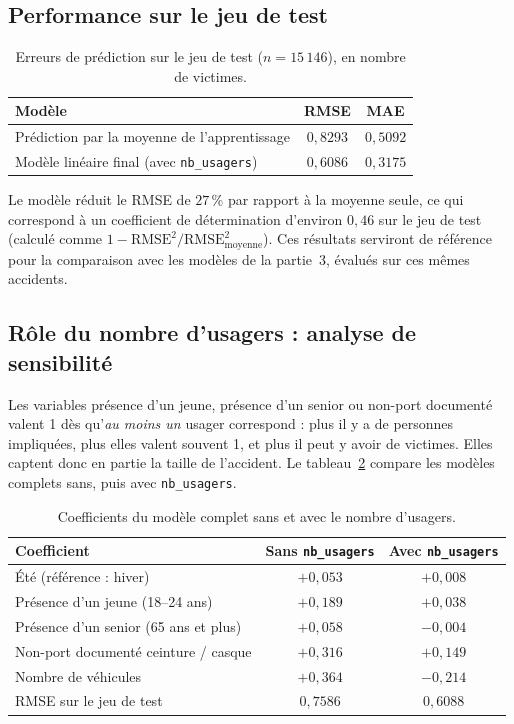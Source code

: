 \documentclass[11pt,a4paper]{article}
\begin{document}
\subsection{Performance sur le jeu de test}
\begin{table}[H]
\centering
\small
\begin{tabular}{lcc}
\toprule
\textbf{Modèle} & \textbf{RMSE} & \textbf{MAE} \\
\midrule
Prédiction par la moyenne de l'apprentissage & $0{,}8293$ & $0{,}5092$ \\
Modèle linéaire final (avec \texttt{nb\_usagers}) & $0{,}6086$ & $0{,}3175$ \\
\bottomrule
\end{tabular}
\caption{Erreurs de prédiction sur le jeu de test ($n = 15\,146$), en nombre de victimes.}
\label{tab:perf_test}
\end{table}
Le modèle réduit le RMSE de $27\,\%$ par rapport à la moyenne seule, ce qui correspond à un coefficient de détermination d'environ $0{,}46$ sur le jeu de test (calculé comme $1 - \text{RMSE}^2/\text{RMSE}_{\text{moyenne}}^2$). Ces résultats serviront de référence pour la comparaison avec les modèles de la partie~3, évalués sur ces mêmes accidents.

\subsection{Rôle du nombre d'usagers : analyse de sensibilité}\label{sec:sensibilite}
Les variables \og présence d'un jeune\fg{}, \og présence d'un senior\fg{} ou \og non-port documenté\fg{} valent 1 dès qu'\emph{au moins un} usager correspond : plus il y a de personnes impliquées, plus elles valent souvent 1, et plus il peut y avoir de victimes. Elles captent donc en partie la taille de l'accident. Le tableau~\ref{tab:sensibilite} compare les modèles complets sans, puis avec \texttt{nb\_usagers}.

\begin{table}[H]
\centering
\small
\begin{tabular}{lcc}
\toprule
\textbf{Coefficient} & \textbf{Sans \texttt{nb\_usagers}} & \textbf{Avec \texttt{nb\_usagers}} \\
\midrule
Été (référence : hiver)               & $+0{,}053$ & $+0{,}008$ \\
Présence d'un jeune (18--24 ans)      & $+0{,}189$ & $+0{,}038$ \\
Présence d'un senior (65 ans et plus) & $+0{,}058$ & $-0{,}004$ \\
Non-port documenté ceinture / casque  & $+0{,}316$ & $+0{,}149$ \\
Nombre de véhicules                   & $+0{,}364$ & $-0{,}214$ \\
\midrule
RMSE sur le jeu de test               & $0{,}7586$ & $0{,}6088$ \\
\bottomrule
\end{tabular}
\caption{Coefficients du modèle complet sans et avec le nombre d'usagers.}
\label{tab:sensibilite}
\end{table}
\end{document}
